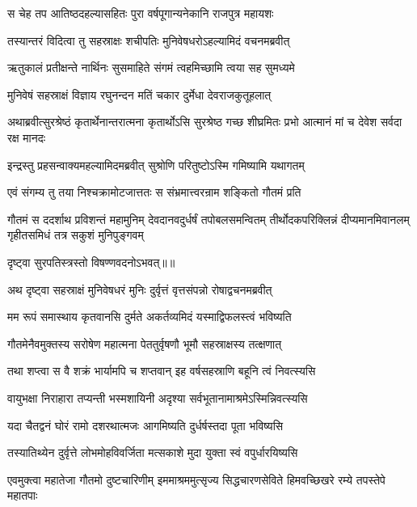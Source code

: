 \twolineshloka
{स चेह तप आतिष्ठदहल्यासहितः पुरा}
{वर्षपूगान्यनेकानि राजपुत्र महायशः} %

\twolineshloka
{तस्यान्तरं विदित्वा तु सहस्राक्षः शचीपतिः}
{मुनिवेषधरोऽहल्यामिदं वचनमब्रवीत्} %

\twolineshloka
{ऋतुकालं प्रतीक्षन्ते नार्थिनः सुसमाहिते}
{संगमं त्वहमिच्छामि त्वया सह सुमध्यमे} %

\twolineshloka
{मुनिवेषं सहस्राक्षं विज्ञाय रघुनन्दन}
{मतिं चकार दुर्मेधा देवराजकुतूहलात्} %

\threelineshloka
{अथाब्रवीत्सुरश्रेष्ठं कृतार्थेनान्तरात्मना}
{कृतार्थोऽसि सुरश्रेष्ठ गच्छ शीघ्रमितः प्रभो}
{आत्मानं मां च देवेश सर्वदा रक्ष मानदः} %

\twolineshloka
{इन्द्रस्तु प्रहसन्वाक्यमहल्यामिदमब्रवीत्}
{सुश्रोणि परितुष्टोऽस्मि गमिष्यामि यथागतम्} %

\twolineshloka
{एवं संगम्य तु तया निश्चक्रामोटजात्ततः}
{स संभ्रमात्त्वरन्राम शङ्कितो गौतमं प्रति} %

\fourlineshloka
{गौतमं स ददर्शाथ प्रविशन्तं महामुनिम्}
{देवदानवदुर्धर्षं तपोबलसमन्वितम्}
{तीर्थोदकपरिक्लिन्नं दीप्यमानमिवानलम्}
{गृहीतसमिधं तत्र सकुशं मुनिपुङ्गवम्} %

{दृष्ट्वा सुरपतिस्त्रस्तो विषण्णवदनोऽभवत्॥॥} %

\addtocounter{shlokacount}{1}

\twolineshloka
{अथ दृष्ट्वा सहस्राक्षं मुनिवेषधरं मुनिः}
{दुर्वृत्तं वृत्तसंपन्नो रोषाद्वचनमब्रवीत्} %

\twolineshloka
{मम रूपं समास्थाय कृतवानसि दुर्मते}
{अकर्तव्यमिदं यस्माद्विफलस्त्वं भविष्यति} %

\twolineshloka
{गौतमेनैवमुक्तस्य सरोषेण महात्मना}
{पेततुर्वृषणौ भूमौ सहस्राक्षस्य तत्क्षणात्} %

\twolineshloka
{तथा शप्त्वा स वै शक्रं भार्यामपि च शप्तवान्}
{इह वर्षसहस्राणि बहूनि त्वं निवत्स्यसि} %

\twolineshloka
{वायुभक्षा निराहारा तप्यन्ती भस्मशायिनी}
{अदृश्या सर्वभूतानामाश्रमेऽस्मिन्निवत्स्यसि} %

\twolineshloka
{यदा चैतद्वनं घोरं रामो दशरथात्मजः}
{आगमिष्यति दुर्धर्षस्तदा पूता भविष्यसि} %

\twolineshloka
{तस्यातिथ्येन दुर्वृत्ते लोभमोहविवर्जिता}
{मत्सकाशे मुदा युक्ता स्वं वपुर्धारयिष्यसि} %

\threelineshloka
{एवमुक्त्वा महातेजा गौतमो दुष्टचारिणीम्}
{इममाश्रममुत्सृज्य सिद्धचारणसेविते}
{हिमवच्छिखरे रम्ये तपस्तेपे महातपाः} %


